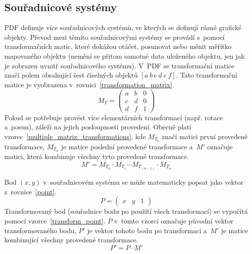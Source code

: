 \subsection*{Souřadnicové systémy}
PDF definuje více souřadnicových systémů, ve kterých se definují různé grafické
objekty. Převod mezi těmito souřadnicovými systémy se provádí s~pomocí
transformačních matic, které dokážou otáčet, posunovat nebo měnit měřítko
mapovaného objektu (nemění se přitom samotné data uloženého objektu, jen jak je
zobrazen uvnitř souřadnicového systému). V~PDF se transformační matice značí polem
obsahující šest číselných objektů $[a~b~c~d~e~f]$. Tato transformační matice je
vyobrazena v~rovnici~\eqref{transformation_matrix}.
\begin{equation}\label{transformation_matrix}
    M_T = 
    \begin{pmatrix}
        a & b & 0 \\
        c & d & 0 \\
        d & f & 1
    \end{pmatrix}
\end{equation}
Pokud se potřebuje provést více elementárních transformací 
(např. rotace a~posun), záleží na jejich posloupnosti provedení. Obecně
platí vzorec~\eqref{multiple_matrix_transformations}, kde $M_{T_0}$ značí matici
první provedené transformace, $M_{T_n}$ je matice poslední provedené transformace
a~$M'$ označuje matici, která kombinuje všechny tyto provedené transformace.
\begin{equation} \label{multiple_matrix_transformations}
    M' = M_{T_0} \cdot M_{T_1} \cdots M_{T_{(n-1)}} \cdot M_{T_n}
\end{equation}

Bod $(x, y)$ v~souřadnicovém systému se může matematicky popsat jako vektor
z~rovnice~\eqref{point}.
\begin{equation}\label{point}
    P = 
    \begin{pmatrix}
        x & y & 1
    \end{pmatrix}
\end{equation}
Transformovaný bod (souřadnice bodu po použití všech transformací) se vypočítá
pomocí vzorce~\eqref{transform_point}. $P$ v~tomto vzorci označuje původní vektor
transformovaného bodu, $P'$ je vektor tohoto bodu po transformaci a~$M'$ je matice
kombinující všechny provedené transformace.
\begin{equation} \label{transform_point}
    P' = P \cdot M'
\end{equation}

